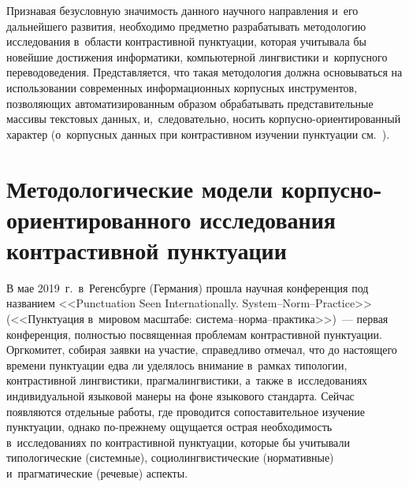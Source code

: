 \begin{multicols}{2}
  Признавая безусловную зна\-чи\-мость данного научного на\-прав\-ле\-ния и~его 
дальнейшего развития, необходимо предметно разрабатывать методологию 
исследования в~об\-ласти контрастивной пунктуации, которая учитывала бы 
новейшие достижения информатики, компьютерной лингвистики 
и~корпусного переводоведения. Пред\-став\-ля\-ет\-ся, что такая методология 
долж\-на основываться на использовании современных информационных 
корпусных инструментов, поз\-во\-ля\-ющих автоматизированным образом 
обрабатывать пред\-ста\-ви\-тель\-ные массивы текс\-то\-вых данных, 
и,~следовательно, носить кор\-пус\-но-ори\-ен\-ти\-ро\-ван\-ный характер 
(о~корпусных данных при контрастивном изуче\-нии пунктуации  
см.~\cite{6-nu}).

    
    \section{Методологические модели  
корпусно-ориентированного исследования контрастивной 
пунктуации}

\vspace*{-3pt}
  
  В мае 2019~г.\ в~Регенсбурге (Германия) про\-шла научная конференция 
под названием <<Punctuation Seen Internationally. System--Norm--Practice>> 
(<<Пунктуация в~мировом мас\-шта\-бе: 
 сис\-те\-ма--нор\-ма--прак\-ти\-ка>>)~--- первая конференция, пол\-ностью\linebreak 
по\-свя\-щен\-ная проб\-ле\-мам контрастивной пунктуации. Оргкомитет, собирая 
заявки на участие, справедливо отмечал, что до на\-сто\-яще\-го времени 
пунктуации едва ли уделялось внимание в~рамках \mbox{типологии}, контрастивной 
лингвистики, прагмалингвистики, а~так\-же в~исследованиях индивидуальной 
языковой манеры на фоне языкового стандарта. Сейчас появляются 
отдельные работы, где проводится сопоставительное изуче\-ние пунктуации, 
однако по-преж\-не\-му ощущается острая не\-об\-хо\-ди\-мость в~исследованиях по 
контрастивной пунктуации, которые бы учитывали типологические 
(сис\-тем\-ные), социолингвистические (нормативные) и~прагматические 
(речевые) ас\-пекты.
  

\end{multicols}
